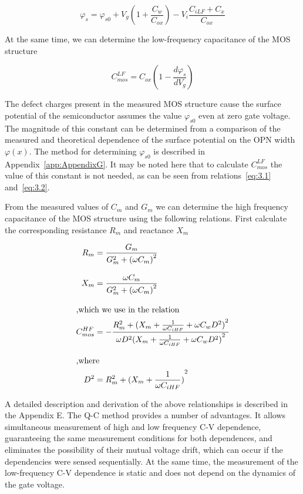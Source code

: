 \begin{equation}\label{eq:3.1}
  \varphi_s = \varphi_{s0} + V_g (1 + \frac{C_w}{C_{ox}}) - V_i \frac{C_{iLF}+C_x}{C_{ox}}
\end{equation}

At the same time, we can determine the low-frequency capacitance of
the MOS structure

\begin{equation}\label{eq:3.2}
  C^{LF}_{mos} = C_{ox} (1 - \frac{d\varphi_s}{dV_g})
\end{equation}

The defect charges present in the measured MOS structure cause the
surface potential of the semiconductor assumes the value
$\varphi_{s0}$ even at zero gate voltage. The magnitude of this
constant can be determined from a comparison of the measured and
theoretical dependence of the surface potential on the OPN width
$\varphi(x)$.  The method for determining $\varphi_{s0}$ is described
in Appendix~\ref{app:AppendixG}. It may be noted here that to
calculate $C^{LF}_{mos}$ the value of this constant is not needed, as
can be seen from relations~\ref{eq:3.1} and~\ref{eq:3.2}.

From the measured values of $C_m$ and $G_m$ we can determine the high
frequency capacitance of the MOS structure using the following
relations.  First calculate the corresponding resistance $R_m$ and
reactance $X_m$

\begin{subequations}\label{eq:3.3}
  \begin{align}
    R_m &= \frac{G_m}{G^2_m + {(\omega C_m)}^2}\label{eq:3.3a}\\[0.3cm]
    X_m &= \frac{\omega C_m}{G^2_m + {(\omega C_m)}^2}\label{eq:3.3b}\\[0.3cm]
    \intertext{,which we use in the relation}
    C^{HF}_{mos} &= - \cfrac{R^2_m + {(X_m + \frac{1}{\omega C_{iHF}} + \omega C_w D^2)}^2}{\omega D^2{(X_m + \frac{1}{\omega C_{iHF}} + \omega C_{w} D^2)}^2}\label{eq:3.3c}\\[0.3cm]
    \intertext{,where}
    D^2 &= R^2_m + {(X_m + \frac{1}{\omega C_{iHF}})}^2\label{eq:3.3d}
  \end{align}
\end{subequations}

A detailed description and derivation of the above relationships is
described in the Appendix E. The Q-C method provides a number of
advantages.  It allows simultaneous measurement of high and low
frequency C-V dependence, guaranteeing the same measurement conditions
for both dependences, and eliminates the possibility of their mutual
voltage drift, which can occur if the dependencies were sensed
sequentially.  At the same time, the measurement of the low-frequency
C-V dependence is static and does not depend on the dynamics of the
gate voltage.

